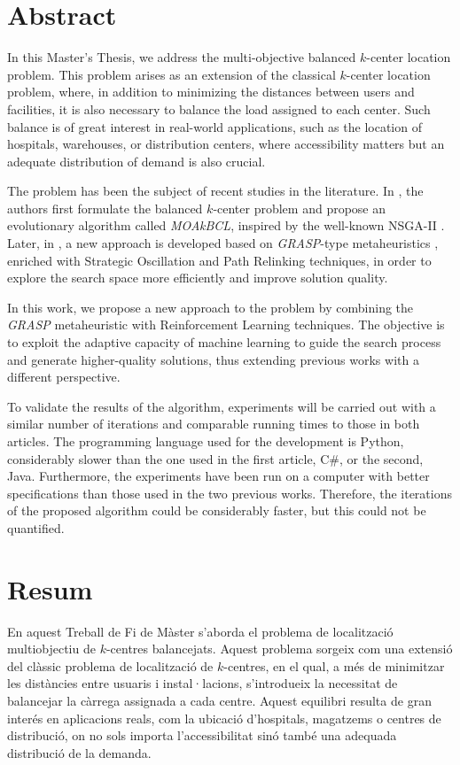 \documentclass[12pt,a4paper]{book}
\begin{document}
\section*{Abstract}
In this Master's Thesis, we address the multi-objective balanced $k$-center location problem. This problem arises as an extension of the classical $k$-center location problem, where, in addition to minimizing the distances between users and facilities, it is also necessary to balance the load assigned to each center. Such balance is of great interest in real-world applications, such as the location of hospitals, warehouses, or distribution centers, where accessibility matters but an adequate distribution of demand is also crucial.

The problem has been the subject of recent studies in the literature. In \cite{k-balanced_1}, the authors first formulate the balanced $k$-center problem and propose an evolutionary algorithm called \textit{MOAkBCL}, inspired by the well-known NSGA-II \citep{NSGA-II}. Later, in \cite{k-Balanced_2}, a new approach is developed based on \textit{GRASP}-type metaheuristics \citep{GRASP}, enriched with Strategic Oscillation \citep{oscillation} and Path Relinking \citep{path_relinking} techniques, in order to explore the search space more efficiently and improve solution quality.

In this work, we propose a new approach to the problem by combining the \textit{GRASP} metaheuristic with Reinforcement Learning techniques. The objective is to exploit the adaptive capacity of machine learning to guide the search process and generate higher-quality solutions, thus extending previous works with a different perspective.

To validate the results of the algorithm, experiments will be carried out with a similar number of iterations and comparable running times to those in both articles. The programming language used for the development is Python, considerably slower than the one used in the first article, C\#, or the second, Java. Furthermore, the experiments have been run on a computer with better specifications than those used in the two previous works. Therefore, the iterations of the proposed algorithm could be considerably faster, but this could not be quantified.

\newpage

\section*{Resum}
En aquest Treball de Fi de Màster s'aborda el problema de localització multiobjectiu de $k$-centres balancejats. Aquest problema sorgeix com una extensió del clàssic problema de localització de $k$-centres, en el qual, a més de minimitzar les distàncies entre usuaris i instal·lacions, s'introdueix la necessitat de balancejar la càrrega assignada a cada centre. Aquest equilibri resulta de gran interés en aplicacions reals, com la ubicació d'hospitals, magatzems o centres de distribució, on no sols importa l'accessibilitat sinó també una adequada distribució de la demanda.
\end{document}
